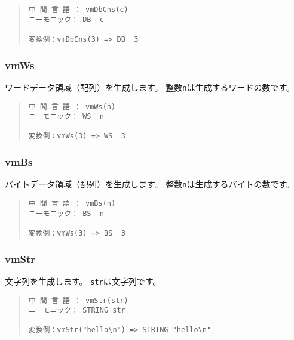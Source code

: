 \begin{quote}
\begin{verbatim}
中 間 言 語 ： vmDbCns(c)
ニーモニック： DB  c   

変換例：vmDbCns(3) => DB  3
\end{verbatim}
\end{quote}

\subsubsection{vmWs}

ワードデータ領域（配列）を生成します。
整数\verb/n/は生成するワードの数です。

\begin{quote}
\begin{verbatim}
中 間 言 語 ： vmWs(n)
ニーモニック： WS  n

変換例：vmWs(3) => WS  3
\end{verbatim}
\end{quote}

\subsubsection{vmBs}

バイトデータ領域（配列）を生成します。
整数\verb/n/は生成するバイトの数です。

\begin{quote}
\begin{verbatim}
中 間 言 語 ： vmBs(n)
ニーモニック： BS  n

変換例：vmWs(3) => BS  3
\end{verbatim}
\end{quote}

\subsubsection{vmStr}

文字列を生成します。
\verb/str/は文字列です。

\begin{quote}
\begin{verbatim}
中 間 言 語 ： vmStr(str)
ニーモニック： STRING str

変換例：vmStr("hello\n") => STRING "hello\n"
\end{verbatim}
\end{quote}
